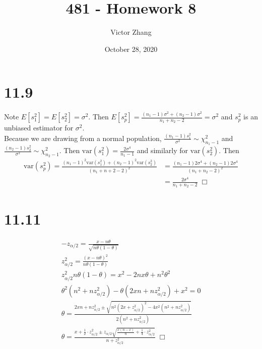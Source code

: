 \documentclass{article}
\title{481 - Homework 8}
\author{Victor Zhang}
\date{October 28, 2020}
\newcommand{\var}[1]{\mathrm{var}(#1)}
\begin{document}
\maketitle

\section*{11.9}
Note $E[s_1^2] = E[s_2^2] = \sigma^2$. Then $E[s_p^2] = \frac{(n_1-1)\sigma^2 + (n_2-1)\sigma^2}{n_1 + n_2 - 2} = \sigma^2$ and $s_p^2$ is an unbiased estimator for $\sigma^2$.\\
Because we are drawing from a normal population, $\frac{(n_1-1)s_1^2}{\sigma^2} \sim \chi^2_{n_1-1}$ and $\frac{(n_2-1)s_2^2}{\sigma^2} \sim \chi^2_{n_2-1}$. Then $\var{s_1^2} = \frac{2\sigma^4}{n_1-1}$ and similarly for $\var{s_2^2}$. Then
\begin{equation*}
\begin{split}
  \var{s_p^2} = \frac{(n_1-1)^2\var{s_1^2} + (n_2-1)^2\var{s_2^2}}{(n_1+n+2-2)^2} &= \frac{(n_1-1)2\sigma^4 + (n_2-1)2\sigma^4}{(n_1+n_2-2)^2}\\
  &= \frac{2\sigma^4}{n_1+n_2-2} \; \Box
\end{split}
\end{equation*}

\section*{11.11}
\begin{gather*}
  -z_{\alpha/2} = \frac{x-n\theta}{\sqrt{n\theta(1-\theta)}}\\
  z^2_{\alpha/2} = \frac{(x-n\theta)^2}{n\theta(1-\theta)}\\
  z^2_{\alpha/2}n\theta(1-\theta) = x^2 - 2nx\theta + n^2\theta^2\\
  \theta^2(n^2 + nz^2_{\alpha/2}) - \theta(2xn + nz^2_{\alpha/2}) + x^2 = 0\\
  \theta = \frac{2xn + nz^2_{\alpha/2} \pm \sqrt{n^2(2x+z^2_{\alpha/2})^2 - 4x^2(n^2+nz^2_{\alpha/2})}}{2(n^2 + nz^2_{\alpha/2})}\\
  \theta = \frac{x + \frac{1}{2}\cdot z^2_{\alpha/2} \pm z_{\alpha/2}\sqrt{\frac{x(n-x)}{n}+ \frac{1}{4}\cdot z^2_{\alpha/2}}}{n + z^2_{\alpha/2}} \; \Box\\
\end{gather*}
\end{document}
